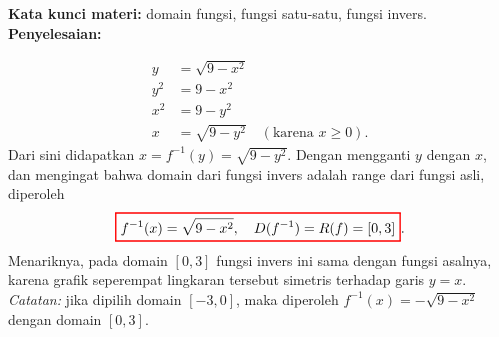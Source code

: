 \documentclass[10pt,openany,a4paper]{article}
\theoremstyle{definition}
\theoremstyle{definition}
\theoremstyle{plain}
\newenvironment{jawab}[2][tes]{%
\par\noindent\textbf{Kata kunci materi:} #1.\\
\textbf{Penyelesaian:} #2%
}{}
\begin{document}
\begin{enumerate}
\begin{jawab}[domain fungsi, fungsi satu-satu, fungsi invers]
{\begin{enumerate}
\begin{align*}
                y &= \sqrt{9-x^2}\\
                y^2 &= 9-x^2\\
                x^2 &= 9-y^2\\
                x &= \sqrt{9-y^2} \quad (\text{karena } x\geq 0).
            \end{align*}
            Dari sini didapatkan $x = f^{-1}(y) = \sqrt{9-y^2}$. Dengan mengganti $y$ dengan $x$, dan mengingat bahwa domain dari fungsi invers adalah range dari fungsi asli, diperoleh
            \begin{align*}
                \colorlet{oldcolor}{.}
        \color{red}
        \setlength{\fboxrule}{1pt} \boxed{\color{oldcolor}f^{-1}(x)=\sqrt{9-x^2},\quad D(f^{-1})=R(f)=[0,3]}\color{oldcolor}.
            \end{align*}
            Menariknya, pada domain $[0,3]$ fungsi invers ini sama dengan fungsi asalnya, karena grafik seperempat lingkaran tersebut simetris terhadap garis $y=x$.\\
            \textit{Catatan:} jika dipilih domain $[-3,0]$, maka diperoleh $f^{-1}(x)=-\sqrt{9-x^2}$ dengan domain $[0,3]$.
        \end{enumerate}
    }
    \end{jawab}


\end{enumerate}
\end{document}
